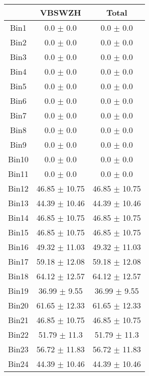   \begin{tabular}{|c|c|c|}
  \hline
      & VBSWZH & Total \\ \cline{1-3} 
     \hline\hline
     Bin1 & 0.0 $\pm$ 0.0 & 0.0 $\pm$ 0.0 \\ \cline{1-3} 
     Bin2 & 0.0 $\pm$ 0.0 & 0.0 $\pm$ 0.0 \\ \cline{1-3} 
     Bin3 & 0.0 $\pm$ 0.0 & 0.0 $\pm$ 0.0 \\ \cline{1-3} 
     Bin4 & 0.0 $\pm$ 0.0 & 0.0 $\pm$ 0.0 \\ \cline{1-3} 
     Bin5 & 0.0 $\pm$ 0.0 & 0.0 $\pm$ 0.0 \\ \cline{1-3} 
     Bin6 & 0.0 $\pm$ 0.0 & 0.0 $\pm$ 0.0 \\ \cline{1-3} 
     Bin7 & 0.0 $\pm$ 0.0 & 0.0 $\pm$ 0.0 \\ \cline{1-3} 
     Bin8 & 0.0 $\pm$ 0.0 & 0.0 $\pm$ 0.0 \\ \cline{1-3} 
     Bin9 & 0.0 $\pm$ 0.0 & 0.0 $\pm$ 0.0 \\ \cline{1-3} 
     Bin10 & 0.0 $\pm$ 0.0 & 0.0 $\pm$ 0.0 \\ \cline{1-3} 
     Bin11 & 0.0 $\pm$ 0.0 & 0.0 $\pm$ 0.0 \\ \cline{1-3} 
     Bin12 & 46.85 $\pm$ 10.75 & 46.85 $\pm$ 10.75 \\ \cline{1-3} 
     Bin13 & 44.39 $\pm$ 10.46 & 44.39 $\pm$ 10.46 \\ \cline{1-3} 
     Bin14 & 46.85 $\pm$ 10.75 & 46.85 $\pm$ 10.75 \\ \cline{1-3} 
     Bin15 & 46.85 $\pm$ 10.75 & 46.85 $\pm$ 10.75 \\ \cline{1-3} 
     Bin16 & 49.32 $\pm$ 11.03 & 49.32 $\pm$ 11.03 \\ \cline{1-3} 
     Bin17 & 59.18 $\pm$ 12.08 & 59.18 $\pm$ 12.08 \\ \cline{1-3} 
     Bin18 & 64.12 $\pm$ 12.57 & 64.12 $\pm$ 12.57 \\ \cline{1-3} 
     Bin19 & 36.99 $\pm$ 9.55 & 36.99 $\pm$ 9.55 \\ \cline{1-3} 
     Bin20 & 61.65 $\pm$ 12.33 & 61.65 $\pm$ 12.33 \\ \cline{1-3} 
     Bin21 & 46.85 $\pm$ 10.75 & 46.85 $\pm$ 10.75 \\ \cline{1-3} 
     Bin22 & 51.79 $\pm$ 11.3 & 51.79 $\pm$ 11.3 \\ \cline{1-3} 
     Bin23 & 56.72 $\pm$ 11.83 & 56.72 $\pm$ 11.83 \\ \cline{1-3} 
     Bin24 & 44.39 $\pm$ 10.46 & 44.39 $\pm$ 10.46 \\ \cline{1-3} 

\end{tabular}
